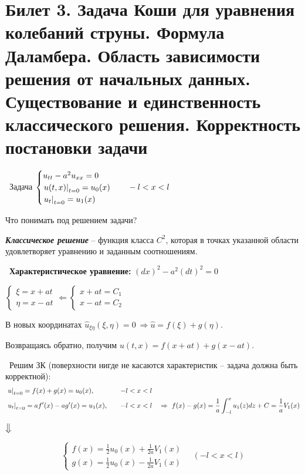 \documentclass[../main.tex]{subfiles}
\begin{document}
  
\section{Билет 3. Задача Коши для уравнения колебаний струны. Формула Даламбера. Область зависимости решения от начальных данных. Существование и единственность классического решения. Корректность постановки задачи}
\textbullet\ Задача $\begin{cases} u_{tt}-a^2u_{xx} = 0\\ \left. u(t,x)\right|_{t=0} = u_0(x)\\ \left. u_t\right|_{t=0} = u_1(x)\end{cases}\quad -l<x<l$

Что понимать под решением задачи?

\begin{definition} \textbf{\emph{Классическое решение}} -- функция класса $C^2$, которая в точках указанной области удовлетворяет уравнению и заданным соотношениям.
\end{definition}

\textbullet\ {\bf Характеристическое уравнение: } $(dx)^2 - a^2(dt)^2 = 0$

$\begin{cases} \xi = x+at \\ \eta = x-at \end{cases} \Leftarrow \begin{cases} x+at = C_1 \\ x-at = C_2 \end{cases}$

В новых координатах $\hat{u}_{\xi\eta}(\xi,\eta) = 0\ \Rightarrow \hat{u} = f(\xi) + g(\eta) $.

Возвращаясь обратно, получим $u(t,x) = f(x+at) + g(x-at)$.
\vspace{0.4em}

\textbullet\ Решим ЗК (поверхности нигде не касаются характеристик -- задача должна быть корректной):
\begin{equation*}
\begin{aligned}
&\left. u\right|_{t=0} = f(x) + g(x) = u_0(x), \quad &-l < x< l&\\
&\left. u_t\right|_{t=0} =  af'(x) - ag'(x) = u_1(x), \quad &-l < x < l& \quad \Rightarrow\ f(x) - g(x) = \frac1{a}\int _{-l}^xu_1(z)dz + C = \frac1{a}V_1(x)
\end{aligned}
\end{equation*}
\begin{center}
$\big\Downarrow$
\end{center}
\begin{equation}
\label{eq::3::dalam}
\tag{*}
\begin{cases} f(x) = \frac1{2}u_0(x) + \frac1{2a}V_1(x) \\ g(x) = \frac1{2}u_0(x) - \frac1{2a}V_1(x) \end{cases} \quad (-l < x< l)
\end{equation}
\end{document}
